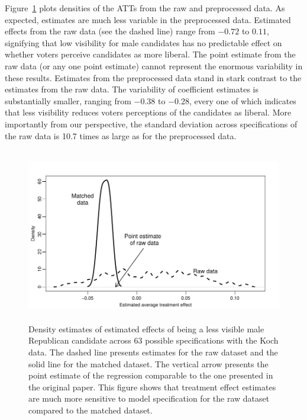 \documentclass[11pt,titlepage]{article}
\begin{document}
Figure~\ref{fg:kochdens} plots densities of the ATTs from the raw and
preprocessed data.  As expected, estimates are much less variable in
the preprocessed data.  Estimated effects from the raw data (see the
dashed line) range from $-0.72$ to $0.11$, signifying that low
visibility for male candidates has no predictable effect on whether
voters perceive candidates as more liberal.  The point estimate from
the raw data (or any one point estimate) cannot represent the enormous
variability in these results.  Estimates from the preprocessed data
stand in stark contrast to the estimates from the raw data.  The
variability of coefficient estimates is substantially smaller, ranging
from $-0.38$ to $-0.28$, every one of which indicates that less
visibility reduces voters perceptions of the candidates as liberal.
More importantly from our perspective, the standard deviation across
specifications of the raw data is 10.7 times as large as for the
preprocessed data.
\begin{figure}[t] 
 \begin{center}
   \includegraphics[height=3in,angle=0]{figs/kochdens.pdf}
 \end{center} 
 \vspace{-0.275in}
 \caption{Density estimates of estimated effects of
   being a less visible male Republican candidate across 63 possible
   specifications with the Koch data.  The dashed line presents
   estimates for the raw dataset and the solid line for the matched
   dataset.  The vertical arrow presents the point estimate of the
   regression comparable to the one presented in the original paper.
   This figure shows that treatment effect estimates are much more
   sensitive to model specification for the raw dataset compared to
   the matched dataset.}
 \label{fg:kochdens}
\end{figure}
\end{document}
